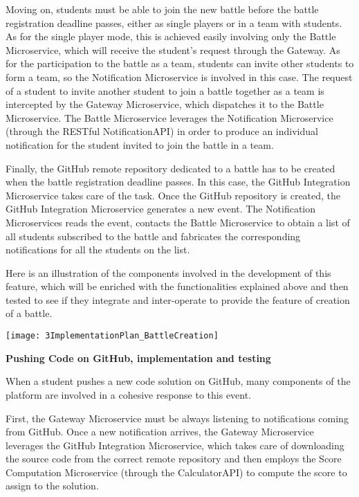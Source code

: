 Moving on, students must be able to join the new battle before the battle registration deadline passes, either as single players or in a team with students. As for the single player mode, this is achieved easily involving only the Battle Microservice, which will receive the student's request through the Gateway.
As for the participation to the battle as a team, students can invite other students to form a team, so the Notification Microservice is involved in this case. The request of a student to invite another student to join a battle together as a team is intercepted by the Gateway Microservice, which dispatches it to the Battle Microservice. The Battle Microservice leverages the Notification Microservice (through the RESTful NotificationAPI) in order to produce an individual notification for the student invited to join the battle in a team.

Finally, the GitHub remote repository dedicated to a battle has to be created when the battle registration deadline passes. In this case, the GitHub Integration Microservice takes care of the task. Once the GitHub repository is created, the GitHub Integration Microservice generates a new event. The Notification Microservices reads the event, contacts the Battle Microservice to obtain a list of all students subscribed to the battle and fabricates the corresponding notifications for all the students on the list.

Here is an illustration of the components involved in the development of this feature, which will be enriched with the functionalities explained above and then tested to see if they integrate and inter-operate to provide the feature of creation of a battle.

\begin{center}
	\texttt{[image: 3ImplementationPlan\_BattleCreation]}
\end{center}

\textbf{Pushing Code on GitHub, implementation and testing}

When a student pushes a new code solution on GitHub, many components of the \app platform are involved in a cohesive response to this event.

First, the Gateway Microservice must be always listening to notifications coming from GitHub. Once a new notification arrives, the Gateway Microservice leverages the GitHub Integration Microservice, which takes care of downloading the source code from the correct remote repository and then employs the Score Computation Microservice (through the CalculatorAPI) to compute the score to assign to the solution.

